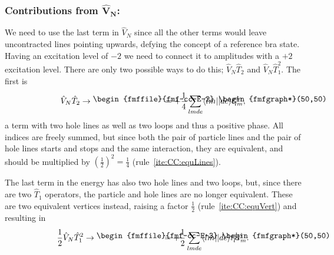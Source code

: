 \subsubsection{Contributions from $\mathbf{\hat{V}_N}$:}
We need to use the last term in $\hat{V}_N$ since all the other terms would leave uncontracted lines pointing upwards, defying the concept of a reference bra state.
Having an excitation level of $-2$ we need to connect it to amplitudes with a $+2$ excitation level.
There are only two possible ways to do this; $\hat{V}_N \hat{T}_2$ and $\hat{V}_N \hat{T}_1^2$.
The first is
\begin{equation}
\hat{V}_N \hat{T}_2
\rightarrow
\parbox{30mm}{
    \textrm{
    \begin{fmffile}{fmf-cc-E-2}
    \begin{fmfgraph*}(50,50)
        \fmfstraight
        \fmfbottom{b1,b2}
        \fmftop{t1,t2}
        \fmf{plain}{b1,b2}
        \fmf{dashes}{t1,t2}
        \fmf{electron,right=0.4}{b1,t1}
        \fmf{electron,right=0.4}{t1,b1}
        \fmf{electron,right=0.4}{b2,t2}
        \fmf{electron,right=0.4}{t2,b2}
    \end{fmfgraph*}
    \end{fmffile}
    }
}
= + \frac{1}{4} \sum_{lmde} \langle lm|| de \rangle t_{lm}^{de}, 
\end{equation}
a term with two hole lines as well as two loops and thus a positive phase.
All indices are freely summed, but since both the pair of particle lines and the pair of hole lines starts and stops and the same interaction, they are equivalent, and should be multiplied by $\left(\frac{1}{2}\right)^2 = \frac{1}{4}$ (rule~\ref{ite:CC:equLines}).

The last term in the energy has also two hole lines and two loops, but, since there are two $\hat{T}_1$ operators, the particle and hole lines are no longer equivalent.
These are two equivalent vertices instead, raising a factor $\frac{1}{2}$ (rule~\ref{ite:CC:equVert}) and resulting in 
\begin{equation}
\frac{1}{2} \hat{V}_N \hat{T}_1^2
\rightarrow
\parbox{28mm}{
    \textrm{
    \begin{fmffile}{fmf-cc-E-3}
        \begin{fmfgraph*}(50,50)
            \fmfstraight
            \fmfbottom{b1,b2,b3,b4}
            \fmftop{t1,t2}
            \fmf{plain}{b1,elBotL,b2}
            \fmf{plain}{b3,elBotR,b4}
            \fmf{phantom,tension=4}{t1,elTopL}
            \fmf{phantom,tension=4}{elTopR,t2}
            \fmf{dashes}{elTopL,elTopR}
            \fmffreeze
            \fmf{electron,right=0.4}{elBotL,elTopL}
            \fmf{electron,right=0.4}{elTopL,elBotL}
            \fmf{electron,right=0.4}{elBotR,elTopR}
            \fmf{electron,right=0.4}{elTopR,elBotR}
        \end{fmfgraph*}
    \end{fmffile}
    }
}
= +\frac{1}{2} \sum_{lmde} \langle lm||de \rangle t_l^d t_m^e .
\end{equation}

